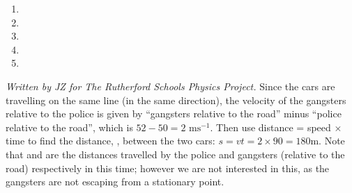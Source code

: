 
\begin{problem} 
{ 
\begin{enumerate}
	\item {}
	\item {}
	\item {}\correct
	\item {}
	\item {}
\end{enumerate}
}
{\textit{Written by JZ for The Rutherford Schools Physics Project.}}
{ Since the cars are travelling on the same line (in the same direction), the velocity of the gangsters relative to the police is given by ``gangsters relative to the road'' minus ``police relative to the road'', which is $52 - 50 = 2\textrm{ ms}^{-1}$. Then use distance = speed $\times$ time to find the distance, , between the two cars: $s = vt = 2 \times 90 = 180 \textrm{m}$. Note that  and   are the distances travelled by the police and gangsters (relative to the road) respectively in this time; however we are not interested in this, as the gangsters are not escaping from a stationary point.
}
\end{problem}